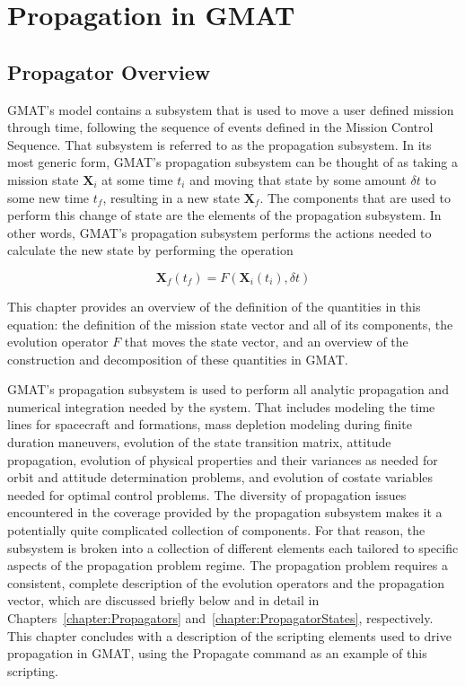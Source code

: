 \chapter{\label{chapter:PropagatorOverview}Propagation in GMAT}

\section{Propagator Overview}

GMAT's model contains a subsystem that is used to move a user defined mission through time,
following the sequence of events defined in the Mission Control Sequence.  That subsystem is
referred to as the propagation subsystem.  In its most generic form, GMAT's propagation subsystem
can be thought of as taking a mission state $\textbf{X}_i$ at some time $t_i$ and moving that state
by some amount $\delta t$ to some new time $t_f$, resulting in a new state $\textbf{X}_f$.  The
components that are used to perform this change of state are the elements of the propagation
subsystem.  In other words, GMAT's propagation subsystem performs the actions needed to calculate
the new state by performing the operation

\begin{equation}\label{eq:abstractProp}
\textbf{X}_f(t_f) = F(\textbf{X}_i(t_i), \delta t)
\end{equation}

\noindent This chapter provides an overview of the definition of the quantities in this equation:
the definition of the mission state vector and all of its components, the evolution operator $F$
that moves the state vector, and an overview of the construction and decomposition of these
quantities in GMAT.

GMAT's propagation subsystem is used to perform all analytic propagation and numerical integration
needed by the system.  That includes modeling the time lines for spacecraft and formations, mass
depletion modeling during finite duration maneuvers, evolution of the state transition matrix,
attitude propagation, evolution of physical properties and their variances as needed for orbit and
attitude determination problems, and evolution of costate variables needed for optimal control
problems.  The diversity of propagation issues encountered in the coverage provided by the
propagation subsystem makes it a potentially quite complicated collection of components.  For that
reason, the subsystem is broken into a collection of different elements each tailored to specific
aspects of the propagation problem regime.  The propagation problem requires a consistent, complete
description of the evolution operators and the propagation vector, which are discussed briefly below
and in detail in Chapters~\ref{chapter:Propagators} and~\ref{chapter:PropagatorStates},
respectively.  This chapter concludes with a description of the scripting elements used to drive
propagation in GMAT, using the Propagate command as an example of this scripting.

